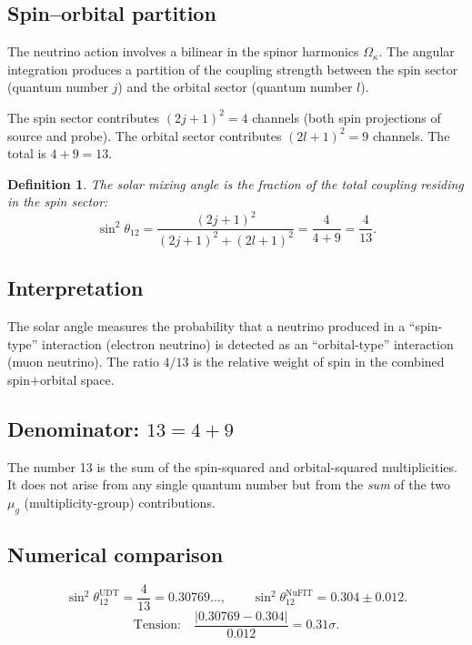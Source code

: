 \documentclass[11pt,letterpaper]{article}
\newtheorem{definition}[theorem]{Definition}
\numberwithin{equation}{section}
\begin{document}
\subsection{Spin--orbital partition}

The neutrino action involves a bilinear in the spinor harmonics
$\Omega_\kappa$. The angular integration produces a partition of the
coupling strength between the spin sector (quantum number $j$) and the
orbital sector (quantum number $l$).

The spin sector contributes $(2j+1)^2 = 4$ channels (both spin projections
of source and probe). The orbital sector contributes $(2l+1)^2 = 9$
channels. The total is $4 + 9 = 13$.

\begin{definition}
The solar mixing angle is the fraction of the total coupling residing in
the spin sector:
\begin{equation}
\label{eq:sin2_12}
\boxed{
  \sin^2\theta_{12} = \frac{(2j+1)^2}{(2j+1)^2 + (2l+1)^2} = \frac{4}{4+9} = \frac{4}{13}.
}
\end{equation}
\end{definition}

\subsection{Interpretation}

The solar angle measures the probability that a neutrino produced in a
``spin-type'' interaction (electron neutrino) is detected as an
``orbital-type'' interaction (muon neutrino). The ratio $4/13$ is the
relative weight of spin in the combined spin$+$orbital space.

\subsection{Denominator: $13 = 4 + 9$}

The number 13 is the sum of the spin-squared and orbital-squared
multiplicities. It does not arise from any single quantum number but from
the \emph{sum} of the two $\mu_g$ (multiplicity-group) contributions.

\subsection{Numerical comparison}

\begin{equation}
  \sin^2\theta_{12}^\mathrm{UDT} = \frac{4}{13} = 0.30769\ldots, \qquad
  \sin^2\theta_{12}^\mathrm{NuFIT} = 0.304 \pm 0.012.
\end{equation}
\begin{equation}
  \text{Tension:}\quad
  \frac{|0.30769 - 0.304|}{0.012} = 0.31\sigma.
\end{equation}
\end{document}

